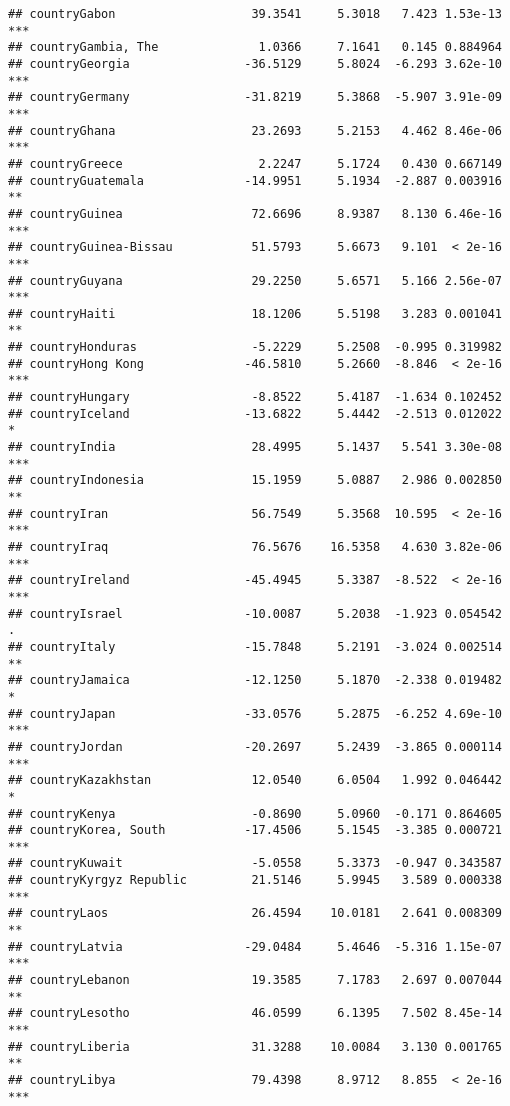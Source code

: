 \documentclass[
  11pt,
]{article}
\begin{document}
\begin{verbatim}
## countryGabon                   39.3541     5.3018   7.423 1.53e-13 ***
## countryGambia, The              1.0366     7.1641   0.145 0.884964    
## countryGeorgia                -36.5129     5.8024  -6.293 3.62e-10 ***
## countryGermany                -31.8219     5.3868  -5.907 3.91e-09 ***
## countryGhana                   23.2693     5.2153   4.462 8.46e-06 ***
## countryGreece                   2.2247     5.1724   0.430 0.667149    
## countryGuatemala              -14.9951     5.1934  -2.887 0.003916 ** 
## countryGuinea                  72.6696     8.9387   8.130 6.46e-16 ***
## countryGuinea-Bissau           51.5793     5.6673   9.101  < 2e-16 ***
## countryGuyana                  29.2250     5.6571   5.166 2.56e-07 ***
## countryHaiti                   18.1206     5.5198   3.283 0.001041 ** 
## countryHonduras                -5.2229     5.2508  -0.995 0.319982    
## countryHong Kong              -46.5810     5.2660  -8.846  < 2e-16 ***
## countryHungary                 -8.8522     5.4187  -1.634 0.102452    
## countryIceland                -13.6822     5.4442  -2.513 0.012022 *  
## countryIndia                   28.4995     5.1437   5.541 3.30e-08 ***
## countryIndonesia               15.1959     5.0887   2.986 0.002850 ** 
## countryIran                    56.7549     5.3568  10.595  < 2e-16 ***
## countryIraq                    76.5676    16.5358   4.630 3.82e-06 ***
## countryIreland                -45.4945     5.3387  -8.522  < 2e-16 ***
## countryIsrael                 -10.0087     5.2038  -1.923 0.054542 .  
## countryItaly                  -15.7848     5.2191  -3.024 0.002514 ** 
## countryJamaica                -12.1250     5.1870  -2.338 0.019482 *  
## countryJapan                  -33.0576     5.2875  -6.252 4.69e-10 ***
## countryJordan                 -20.2697     5.2439  -3.865 0.000114 ***
## countryKazakhstan              12.0540     6.0504   1.992 0.046442 *  
## countryKenya                   -0.8690     5.0960  -0.171 0.864605    
## countryKorea, South           -17.4506     5.1545  -3.385 0.000721 ***
## countryKuwait                  -5.0558     5.3373  -0.947 0.343587    
## countryKyrgyz Republic         21.5146     5.9945   3.589 0.000338 ***
## countryLaos                    26.4594    10.0181   2.641 0.008309 ** 
## countryLatvia                 -29.0484     5.4646  -5.316 1.15e-07 ***
## countryLebanon                 19.3585     7.1783   2.697 0.007044 ** 
## countryLesotho                 46.0599     6.1395   7.502 8.45e-14 ***
## countryLiberia                 31.3288    10.0084   3.130 0.001765 ** 
## countryLibya                   79.4398     8.9712   8.855  < 2e-16 ***

\end{verbatim}
\end{document}
